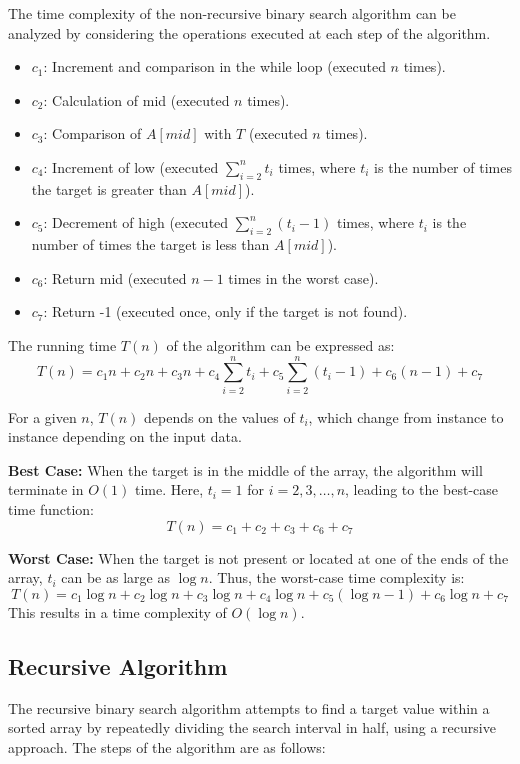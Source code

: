 \documentclass{article}
\begin{document}
The time complexity of the non-recursive binary search algorithm can be analyzed by considering the operations executed at each step of the algorithm.

\begin{itemize}
    \item \(c_1\): Increment and comparison in the while loop (executed \(n\) times).
    \item \(c_2\): Calculation of mid (executed \(n\) times).
    \item \(c_3\): Comparison of \(A[mid]\) with \(T\) (executed \(n\) times).
    \item \(c_4\): Increment of low (executed \(\sum_{i=2}^{n} t_i\) times, where \(t_i\) is the number of times the target is greater than \(A[mid]\)).
    \item \(c_5\): Decrement of high (executed \(\sum_{i=2}^{n} (t_i - 1)\) times, where \(t_i\) is the number of times the target is less than \(A[mid]\)).
    \item \(c_6\): Return mid (executed \(n - 1\) times in the worst case).
    \item \(c_7\): Return -1 (executed once, only if the target is not found).
\end{itemize}

The running time \(T(n)\) of the algorithm can be expressed as:
\[ T(n) = c_1 n + c_2 n + c_3 n + c_4 \sum_{i=2}^{n} t_i + c_5 \sum_{i=2}^{n} (t_i - 1) + c_6 (n - 1) + c_7 \]

For a given \(n\), \(T(n)\) depends on the values of \(t_i\), which change from instance to instance depending on the input data.

\textbf{Best Case:} When the target is in the middle of the array, the algorithm will terminate in \(O(1)\) time. Here, \(t_i = 1\) for \(i = 2, 3, \ldots, n\), leading to the best-case time function:
\[ T(n) = c_1 + c_2 + c_3 + c_6 + c_7 \]

\textbf{Worst Case:} When the target is not present or located at one of the ends of the array, \(t_i\) can be as large as \(\log n\). Thus, the worst-case time complexity is:
\[ T(n) = c_1 \log n + c_2 \log n + c_3 \log n + c_4 \log n + c_5 (\log n - 1) + c_6 \log n + c_7 \]
This results in a time complexity of \(O(\log n)\).

\subsection{Recursive Algorithm\cite{chatgpt2023}}
The recursive binary search algorithm attempts to find a target value within a sorted array by repeatedly dividing the search interval in half, using a recursive approach. The steps of the algorithm are as follows:
\end{document}
